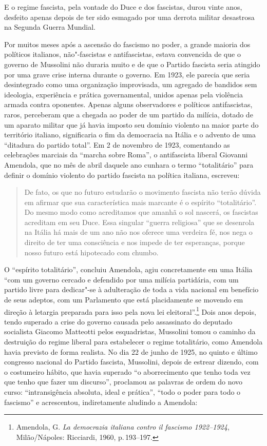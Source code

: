 E o regime fascista, pela vontade do Duce e dos fascistas, durou vinte
anos, desfeito apenas depois de ter sido esmagado por uma derrota
militar desastrosa na Segunda Guerra Mundial.

Por muitos meses após a ascensão do fascismo no poder, a grande maioria
dos políticos italianos, não"-fascistas e antifascistas, estava
convencida de que o governo de Mussolini não duraria muito e de que o
Partido fascista seria atingido por uma grave crise interna durante o
governo. Em 1923, ele parecia que seria desintegrado como uma
organização improvisada, um agregado de bandidos sem ideologia,
experiência e prática governamental, unidos apenas pela violência armada
contra oponentes. Apenas alguns observadores e políticos antifascistas,
raros, perceberam que a chegada ao poder de um partido da milícia,
dotado de um aparato militar que já havia imposto seu domínio violento
na maior parte do território italiano, significaria o fim da democracia
na Itália e o advento de uma ``ditadura do partido total''. Em 2 de
novembro de 1923, comentando as celebrações marciais da ``marcha sobre
Roma'', o antifascista liberal Giovanni Amendola, que no mês de abril
daquele ano cunhara o termo ``totalitário'' para definir o domínio
violento do partido fascista na política italiana, escreveu:

\begin{quote}
De fato, os que no futuro estudarão o movimento fascista não terão
dúvida em afirmar que sua característica mais marcante é o espírito
``totalitário''. Do mesmo modo como acreditamos que amanhã o sol
nascerá, os fascistas acreditam em seu Duce. Essa singular ``guerra
religiosa'' que se desenrola na Itália há mais de um ano não nos oferece
uma verdeira fé, nos nega o direito de ter uma consciência e nos impede
de ter esperanças, porque nosso futuro está hipotecado com chumbo.
\end{quote}

O ``espírito totalitário'', concluiu Amendola, agiu concretamente em uma
Itália ``com um governo cercado e defendido por uma milícia partidária,
com um partido livre para dedicar"-se à adulteração de toda a vida
nacional em benefício de seus adeptos, com um Parlamento que está
placidamente se movendo em direção à letargia preparada para isso pela
nova lei eleitoral''.\footnote{Amendola, G. \emph{La democrazia italiana
  contro il fascismo 1922--1924}, Milão/Nápoles: Ricciardi, 1960, p.\,193--197.} Dois anos depois, tendo superado a crise do governo causada
pelo assassinato do deputado socialista Giacomo Matteotti pelos
esquadristas, Mussolini tomou o caminho da destruição do regime liberal
para estabelecer o regime totalitário, como Amendola havia previsto de
forma realista. No dia 22 de junho de 1925, no quinto e último congresso
nacional do Partido fascista, Mussolini, depois de estrear dizendo, com
o costumeiro hábito, que havia superado ``o aborrecimento que tenho toda
vez que tenho que fazer um discurso'', proclamou as palavras de ordem do
novo curso: ``intransigência absoluta, ideal e prática'', ``todo o poder
para todo o fascismo'' e acrescentou, indiretamente aludindo a Amendola:

